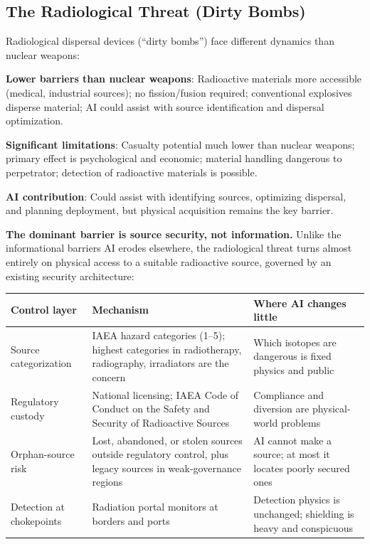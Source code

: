 \documentclass[11pt,letterpaper]{article}
\begin{document}
\subsection{The Radiological Threat (Dirty Bombs)}

Radiological dispersal devices (``dirty bombs'') face different dynamics than nuclear weapons:

\textbf{Lower barriers than nuclear weapons}: Radioactive materials more accessible (medical, industrial sources); no fission/fusion required; conventional explosives disperse material; AI could assist with source identification and dispersal optimization.

\textbf{Significant limitations}: Casualty potential much lower than nuclear weapons; primary effect is psychological and economic; material handling dangerous to perpetrator; detection of radioactive materials is possible.

\textbf{AI contribution}: Could assist with identifying sources, optimizing dispersal, and planning deployment, but physical acquisition remains the key barrier.

\textbf{The dominant barrier is source security, not information.} Unlike the informational barriers AI erodes elsewhere, the radiological threat turns almost entirely on physical access to a suitable radioactive source, governed by an existing security architecture:

\begin{center}
\small
\begin{tabular}{L{3cm}L{5cm}L{4cm}}
\toprule
\textbf{Control layer} & \textbf{Mechanism} & \textbf{Where AI changes little} \\
\midrule
Source categorization & IAEA hazard categories (1--5); highest categories in radiotherapy, radiography, irradiators are the concern & Which isotopes are dangerous is fixed physics and public \\
Regulatory custody & National licensing; IAEA Code of Conduct on the Safety and Security of Radioactive Sources & Compliance and diversion are physical-world problems \\
Orphan-source risk & Lost, abandoned, or stolen sources outside regulatory control, plus legacy sources in weak-governance regions & AI cannot make a source; at most it locates poorly secured ones \\
Detection at chokepoints & Radiation portal monitors at borders and ports & Detection physics is unchanged; shielding is heavy and conspicuous \\
\bottomrule
\end{tabular}
\end{center}
\end{document}
